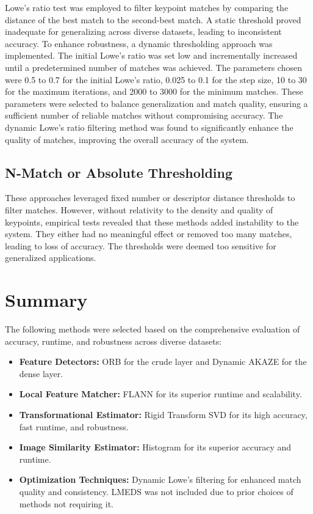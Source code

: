 Lowe's ratio test was employed to filter keypoint matches by comparing the distance of the best match to the second-best match. A static threshold proved inadequate for generalizing across diverse datasets, leading to inconsistent accuracy. To enhance robustness, a dynamic thresholding approach was implemented. The initial Lowe's ratio was set low and incrementally increased until a predetermined number of matches was achieved. The parameters chosen were 0.5 to 0.7 for the initial Lowe's ratio, 0.025 to 0.1 for the step size, 10 to 30 for the maximum iterations, and 2000 to 3000 for the minimum matches. These parameters were selected to balance generalization and match quality, ensuring a sufficient number of reliable matches without compromising accuracy. The dynamic Lowe's ratio filtering method was found to significantly enhance the quality of matches, improving the overall accuracy of the system.


\subsection{{N-Match or Absolute Thresholding}}
These approaches leveraged fixed number or descriptor distance thresholds to filter matches. However, without relativity to the density and quality of keypoints, empirical tests revealed that these methods added instability to the system. They either had no meaningful effect or removed too many matches, leading to loss of accuracy. The thresholds were deemed too sensitive for generalized applications. 



\section{Summary}
The following methods were selected based on the comprehensive evaluation of accuracy, runtime, and robustness across diverse datasets:

\begin{itemize}
    \item \textbf{Feature Detectors:} ORB for the crude layer and Dynamic AKAZE for the dense layer.
    \item \textbf{Local Feature Matcher:} FLANN for its superior runtime and scalability.
    \item \textbf{Transformational Estimator:} Rigid Transform SVD for its high accuracy, fast runtime, and robustness.
    \item \textbf{Image Similarity Estimator:} Histogram for its superior accuracy and runtime.
    \item \textbf{Optimization Techniques:} Dynamic Lowe's filtering for enhanced match quality and consistency. LMEDS was not included due to prior choices of methods not requiring it.
\end{itemize}